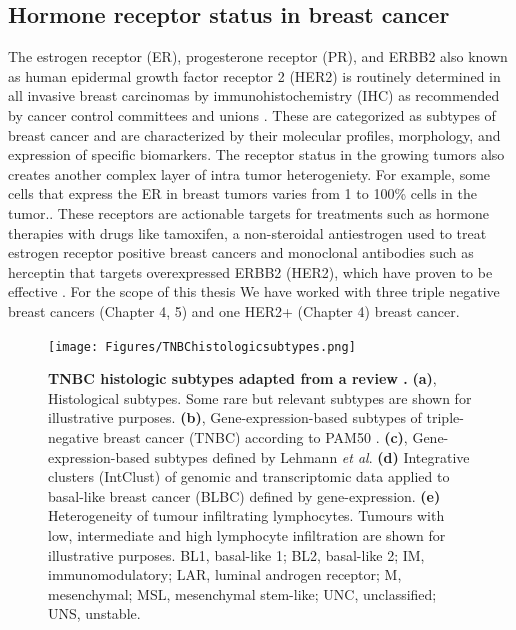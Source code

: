 \subsection{Hormone receptor status in breast cancer}

The estrogen receptor (ER), progesterone receptor (PR), and ERBB2 also known as human epidermal growth factor receptor 2 (HER2) is routinely determined in all invasive breast carcinomas by immunohistochemistry (IHC) as recommended by cancer control committees and unions \cite{turashvili2017tumor, hammond2010college, wolff2013american}. These are categorized as subtypes of breast cancer and are characterized by their molecular profiles, morphology, and expression of specific biomarkers. The receptor status in the growing tumors also creates another complex layer of intra tumor heterogeniety. For example, some cells that express the ER in breast tumors varies from 1 to 100\% cells in the tumor.\cite{januvskevivciene2019heterogeneity, visvader2011cells}. These receptors are actionable targets for treatments such as hormone therapies with drugs like tamoxifen, a non-steroidal antiestrogen used to treat estrogen receptor positive breast cancers \cite{jordan2003tamoxifen,fisher2005tamoxifen} and monoclonal antibodies such as herceptin that targets overexpressed ERBB2 (HER2), which have proven to be effective \cite{piccart2005trastuzumab,slamon2011adjuvant}.  
For the scope of this thesis We have worked with three triple negative breast cancers (Chapter 4, 5) and one HER2+ (Chapter 4) breast cancer.



\begin{figure}
\centering
\texttt{[image: Figures/TNBChistologicsubtypes.png]}
	\caption[TNBC histologic subtypes adapted from a rev \cite{bianchini2016triple} ]
	{\small
	    \textbf{TNBC histologic subtypes adapted from a review  \cite{bianchini2016triple}.}
	    \textbf{(a)}, Histological subtypes. Some rare but relevant subtypes are shown for
illustrative purposes.
	    \textbf{(b)}, Gene-expression-based subtypes of triple-negative breast cancer (TNBC) according to PAM50 \cite{prat2013molecular}.
	    \textbf{(c)}, Gene-expression-based subtypes defined by Lehmann \textit{et al}.\cite{lehmann2011identification}
	     \textbf{(d)} Integrative clusters (IntClust) of genomic and transcriptomic data applied to basal-like breast cancer (BLBC) defined by gene-expression.
	     \textbf{(e)} Heterogeneity of tumour infiltrating lymphocytes. Tumours with low, intermediate and high lymphocyte infiltration are shown for illustrative
purposes. BL1, basal-like 1; BL2, basal-like 2; IM, immunomodulatory; LAR, luminal androgen receptor; M, mesenchymal;
MSL, mesenchymal stem-like; UNC, unclassified; UNS, unstable.
	}
	\label{fig:TNBChistologicsubtypes}
\end{figure}

